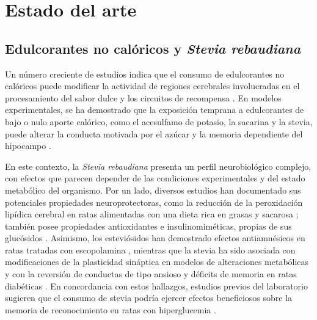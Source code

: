 \chapter{Estado del arte}\label{cap:estado-arte}

\section{Edulcorantes no calóricos y \textit{Stevia rebaudiana}}\label{sec:stevia-evidencia}

Un número creciente de estudios indica que el consumo de edulcorantes no calóricos puede modificar la actividad de regiones cerebrales involucradas en el procesamiento del sabor dulce y los circuitos de recompensa \cite{yunker2020nns,frank2008sucrose,green2012diet}. En modelos experimentales, se ha demostrado que la exposición temprana a edulcorantes de bajo o nulo aporte calórico, como el acesulfamo de potasio, la sacarina y la stevia, puede alterar la conducta motivada por el azúcar y la memoria dependiente del hipocampo \cite{tsan2022lcs}.

En este contexto, la \textit{Stevia rebaudiana} presenta un perfil neurobiológico complejo, con efectos que parecen depender de las condiciones experimentales y del estado metabólico del organismo. Por un lado, diversos estudios han documentado sus potenciales propiedades neuroprotectoras, como la reducción de la peroxidación lipídica cerebral en ratas alimentadas con una dieta rica en grasas y sacarosa \cite{pozdnyakova2025stevia}; también posee propiedades antioxidantes e insulinomiméticas, propias de sus glucósidos \cite{prata2017glycosides}. Asimismo, los esteviósidos han demostrado efectos antiamnésicos en ratas tratadas con escopolamina \cite{singh2010stevioside}, mientras que la stevia ha sido asociada con modificaciones de la plasticidad sináptica en modelos de alteraciones metabólicas \cite{chavushyan2017stevia} y con la reversión de conductas de tipo ansioso y déficits de memoria en ratas diabéticas \cite{khakpai2023stevia}. En concordancia con estos hallazgos, estudios previos del laboratorio sugieren que el consumo de stevia podría ejercer efectos beneficiosos sobre la memoria de reconocimiento en ratas con hiperglucemia \cite{marchena2025stevia}.

